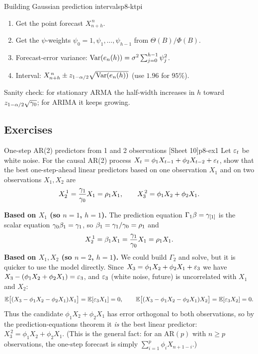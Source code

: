 \begin{keytech}{Building Gaussian prediction intervals}{p8-ktpi}
\begin{enumerate}
  \item Get the point forecast $X^{\,n}_{n+h}$.
  \item Get the $\psi$-weights $\psi_0=1,\psi_1,\dots,\psi_{h-1}$ from
        $\Theta(B)/\Phi(B)$.
  \item Forecast-error variance: $\operatorname{Var}(e_n(h))=\sigma^2\sum_{j=0}^{h-1}\psi_j^2$.
  \item Interval: $X^{\,n}_{n+h}\pm z_{1-\alpha/2}\sqrt{\operatorname{Var}(e_n(h))}$ (use
        $1.96$ for $95\%$).
\end{enumerate}
Sanity check: for stationary ARMA the half-width increases in $h$ toward
$z_{1-\alpha/2}\sqrt{\gamma_0}$; for ARIMA it keeps growing.
\end{keytech}

\subsection{Exercises}

\begin{exercise}{One-step AR(2) predictors from 1 and 2 observations \quad\textnormal{[Sheet 10]}}{p8-ex1}
Let $\varepsilon_t$ be white noise. For the causal AR(2) process
$X_t=\phi_1X_{t-1}+\phi_2X_{t-2}+\varepsilon_t$, show that the best one-step-ahead
linear predictors based on one observation $X_1$ and on two observations
$X_1,X_2$ are
\[
X^{\,1}_2=\frac{\gamma_1}{\gamma_0}X_1=\rho_1X_1,
\qquad
X^{\,2}_3=\phi_1X_2+\phi_2X_1 .
\]
\end{exercise}
\begin{solution}
\textbf{Based on $X_1$ (so $n=1$, $h=1$).} The prediction equation
$\Gamma_1\beta=\gamma_{[1]}$ is the scalar equation $\gamma_0\beta_1=\gamma_1$, so
$\beta_1=\gamma_1/\gamma_0=\rho_1$ and
\[
X^{\,1}_2=\beta_1X_1=\frac{\gamma_1}{\gamma_0}X_1=\rho_1X_1 .
\]
\textbf{Based on $X_1,X_2$ (so $n=2$, $h=1$).} We could build $\Gamma_2$ and
solve, but it is quicker to use the model directly. Since
$X_3=\phi_1X_2+\phi_2X_1+\varepsilon_3$ we have
$X_3-(\phi_1X_2+\phi_2X_1)=\varepsilon_3$, and $\varepsilon_3$ (white noise, future) is
uncorrelated with $X_1$ and $X_2$:
\[
\mathbb{E}\big[(X_3-\phi_1X_2-\phi_2X_1)X_1\big]=\mathbb{E}[\varepsilon_3X_1]=0,
\qquad
\mathbb{E}\big[(X_3-\phi_1X_2-\phi_2X_1)X_2\big]=\mathbb{E}[\varepsilon_3X_2]=0 .
\]
Thus the candidate $\phi_1X_2+\phi_2X_1$ has error orthogonal to both
observations, so by the prediction-equations theorem it \emph{is} the best
linear predictor: $X^{\,2}_3=\phi_1X_2+\phi_2X_1$. (This is the general fact: for
an AR$(p)$ with $n\ge p$ observations, the one-step forecast is simply
$\sum_{i=1}^p\phi_iX_{n+1-i}$.)
\end{solution}

